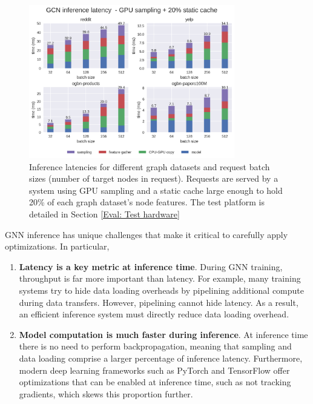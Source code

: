 \begin{figure}[h!]
    \centering
    \includegraphics[width=0.8\textwidth]{figures/GCN_latency_breakdown_gpu_sampled_with_cache.png}
    
    \caption{Inference latencies for different graph datasets and request batch sizes (number of target nodes in request). Requests are served by a system using GPU sampling and a static cache large enough to hold 20\% of each graph dataset's node features. The test platform is detailed in Section \ref{Eval: Test hardware}}
    \label{GPU Sampling Latency Breakdown}
\end{figure}    


GNN inference has unique challenges that make it critical to carefully apply optimizations. In particular,

\begin{enumerate}
    \item \textbf{Latency is a key metric at inference time}. During GNN training, throughput is far more important than latency. For example, many training systems try to hide data loading overheads by pipelining additional compute during data transfers. However, pipelining cannot hide latency. As a result, an efficient inference system must directly reduce data loading overhead.
    \item \textbf{Model computation is much faster during inference}. At inference time there is no need to perform backpropagation, meaning that sampling and data loading comprise a larger percentage of inference latency. Furthermore, modern deep learning frameworks such as PyTorch \cite{PyTorch_2019} and TensorFlow \cite{tensorflow2015-whitepaper} offer optimizations that can be enabled at inference time, such as not tracking gradients, which skews this proportion further.
\end{enumerate}




